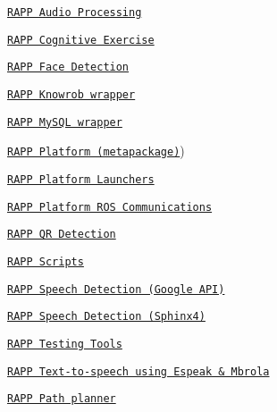 \begin{DoxyItemize}
\item \href{https://github.com/rapp-project/rapp-platform/wiki/RAPP-Audio-Processing}{\tt R\-A\-P\-P Audio Processing}
\item \href{https://github.com/rapp-project/rapp-platform/wiki/RAPP-Cognitive-Exercise}{\tt R\-A\-P\-P Cognitive Exercise}
\item \href{https://github.com/rapp-project/rapp-platform/wiki/RAPP-Face-Detection}{\tt R\-A\-P\-P Face Detection}
\item \href{https://github.com/rapp-project/rapp-platform/wiki/RAPP-Knowrob-wrapper}{\tt R\-A\-P\-P Knowrob wrapper}
\item \href{https://github.com/rapp-project/rapp-platform/wiki/RAPP-MySQL-wrapper}{\tt R\-A\-P\-P My\-S\-Q\-L wrapper}
\item \href{https://github.com/rapp-project/rapp-platform/wiki/RAPP-Platform-(metapackage}{\tt R\-A\-P\-P Platform (metapackage)})
\item \href{https://github.com/rapp-project/rapp-platform/wiki/RAPP-Platform-Launchers}{\tt R\-A\-P\-P Platform Launchers}
\item \href{https://github.com/rapp-project/rapp-platform/wiki/RAPP-Platform-ROS-Communications}{\tt R\-A\-P\-P Platform R\-O\-S Communications}
\item \href{https://github.com/rapp-project/rapp-platform/wiki/RAPP-QR-Detection}{\tt R\-A\-P\-P Q\-R Detection}
\item \href{https://github.com/rapp-project/rapp-platform/wiki/RAPP-Scripts}{\tt R\-A\-P\-P Scripts}
\item \href{https://github.com/rapp-project/rapp-platform/wiki/RAPP-Speech-Detection-using-Google-API}{\tt R\-A\-P\-P Speech Detection (Google A\-P\-I)}
\item \href{https://github.com/rapp-project/rapp-platform/wiki/RAPP-Speech-Detection-using-Sphinx4}{\tt R\-A\-P\-P Speech Detection (Sphinx4)}
\item \href{https://github.com/rapp-project/rapp-platform/wiki/RAPP-Testing-Tools}{\tt R\-A\-P\-P Testing Tools}
\item \href{https://github.com/rapp-project/rapp-platform/wiki/RAPP-Text-to-speech-using-Espeak-&-Mbrola}{\tt R\-A\-P\-P Text-\/to-\/speech using Espeak \& Mbrola}
\item \href{https://github.com/rapp-project/rapp-platform/wiki/RAPP-Path-planner}{\tt R\-A\-P\-P Path planner}
\end{DoxyItemize}

